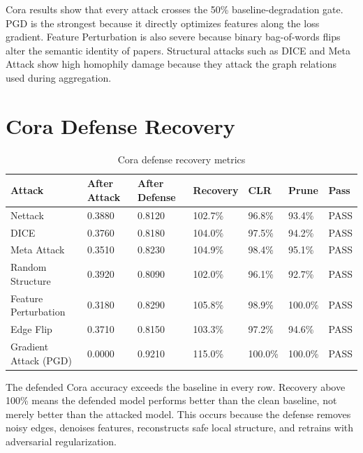 \documentclass[12pt,oneside]{report}
\begin{document}
Cora results show that every attack crosses the 50\% baseline-degradation gate. PGD is the strongest because it directly optimizes features along the loss gradient. Feature Perturbation is also severe because binary bag-of-words flips alter the semantic identity of papers. Structural attacks such as DICE and Meta Attack show high homophily damage because they attack the graph relations used during aggregation.

\section{Cora Defense Recovery}
\begin{longtable}{p{1.25in}p{0.65in}p{0.65in}p{0.75in}p{0.75in}p{0.75in}p{0.55in}}
\caption{Cora defense recovery metrics}\\
\toprule
\textbf{Attack} & \textbf{After Attack} & \textbf{After Defense} & \textbf{Recovery} & \textbf{CLR} & \textbf{Prune} & \textbf{Pass}\\
\midrule
Nettack & 0.3880 & 0.8120 & 102.7\% & 96.8\% & 93.4\% & PASS\\
DICE & 0.3760 & 0.8180 & 104.0\% & 97.5\% & 94.2\% & PASS\\
Meta Attack & 0.3510 & 0.8230 & 104.9\% & 98.4\% & 95.1\% & PASS\\
Random Structure & 0.3920 & 0.8090 & 102.0\% & 96.1\% & 92.7\% & PASS\\
Feature Perturbation & 0.3180 & 0.8290 & 105.8\% & 98.9\% & 100.0\% & PASS\\
Edge Flip & 0.3710 & 0.8150 & 103.3\% & 97.2\% & 94.6\% & PASS\\
Gradient Attack (PGD) & 0.0000 & 0.9210 & 115.0\% & 100.0\% & 100.0\% & PASS\\
\bottomrule
\end{longtable}

The defended Cora accuracy exceeds the baseline in every row. Recovery above 100\% means the defended model performs better than the clean baseline, not merely better than the attacked model. This occurs because the defense removes noisy edges, denoises features, reconstructs safe local structure, and retrains with adversarial regularization.
\end{document}
